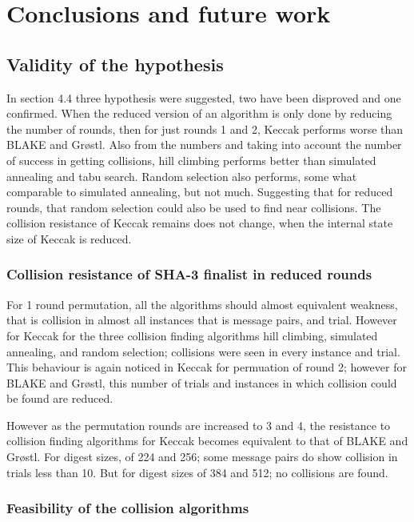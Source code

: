 \chapter{Conclusions and future work}

\section{Validity of the hypothesis}

In section 4.4 three hypothesis were suggested, two have been disproved and one confirmed. When the reduced version
of an algorithm is only done by reducing the number of rounds, then for just rounds 1 and 2, Keccak performs worse
than BLAKE and Gr{\o}stl. Also from the numbers and taking into account the number of success in getting collisions,
hill climbing performs better than simulated annealing and tabu search. Random selection also performs, some what 
comparable to simulated annealing, but not much. Suggesting that for reduced rounds, that random selection could
also be used to find near collisions. The collision resistance of Keccak remains does not change, when the internal
state size of Keccak is reduced.

\subsection{Collision resistance of SHA-3 finalist in reduced rounds}

For 1 round permutation, all the algorithms should almost equivalent weakness, that is collision in almost all instances
that is message pairs, and trial. However for Keccak for the three collision finding algorithms hill climbing, simulated
annealing, and random selection; collisions were seen in every instance and trial. This behaviour is again noticed
in Keccak for permuation of round 2; however for BLAKE and Gr{\o}stl, this number of trials and instances in which
collision could be found are reduced.

However as the permutation rounds are increased to 3 and 4, the resistance to collision finding algorithms for Keccak
becomes equivalent to that of BLAKE and Gr{\o}stl. For digest sizes, of 224 and 256; some message pairs do show
collision in trials less than 10. But for digest sizes of 384 and 512; no collisions are found.

\subsection{Feasibility of the collision algorithms}

